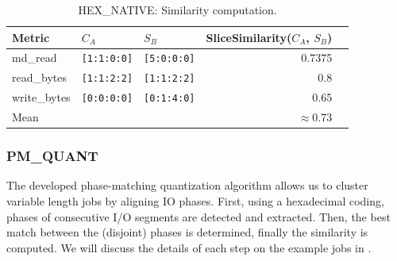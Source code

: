 \documentclass{jhps}
\begin{document}


\begin{table}[t]
\centering
\begin{tabular}{lllrr}
  Metric       & $C_A$                 & $S_B$                 & SliceSimilarity($C_A$, $S_B$) \\
  \midrule
  md\_read     & \lstinline|[1:1:0:0]| & \lstinline|[5:0:0:0]| & 0.7375                        \\
  read\_bytes  & \lstinline|[1:1:2:2]| & \lstinline|[1:1:2:2]| & 0.8                           \\
  write\_bytes & \lstinline|[0:0:0:0]| & \lstinline|[0:1:4:0]| & 0.65                          \\
  \midrule
  Mean         &                       &                       & $\approx$0.73                          \\
\end{tabular}
\caption{HEX\_NATIVE: Similarity computation.}
\label{tab:hex_native:compute_sim}
\end{table}


\subsubsection{PM\_QUANT}
The developed phase-matching quantization algorithm allows us to cluster variable length jobs by aligning IO phases.
First, using a hexadecimal coding, phases of consecutive I/O segments are detected and extracted.
Then, the best match between the (disjoint) phases is determined, finally the similarity is computed.
We will discuss the details of each step on the example jobs in .
\end{document}
